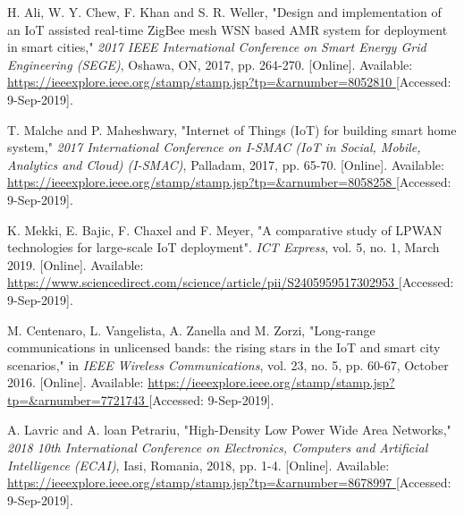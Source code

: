

\begin{thebibliography}{9}



H. Ali, W. Y. Chew, F. Khan and S. R. Weller, "Design and implementation of an IoT assisted real-time ZigBee mesh WSN based AMR system for deployment in smart cities," \textit{2017 IEEE International Conference on Smart Energy Grid Engineering (SEGE)}, Oshawa, ON, 2017, pp. 264-270.
[Online]. Available:
\url{
https://ieeexplore.ieee.org/stamp/stamp.jsp?tp=&arnumber=8052810
}
[Accessed: 9-Sep-2019].


T. Malche and P. Maheshwary, "Internet of Things (IoT) for building smart home system," \textit{2017 International Conference on I-SMAC (IoT in Social, Mobile, Analytics and Cloud) (I-SMAC)}, Palladam, 2017, pp. 65-70.
[Online]. Available:
\url{
https://ieeexplore.ieee.org/stamp/stamp.jsp?tp=&arnumber=8058258
}
[Accessed: 9-Sep-2019].


K. Mekki, E. Bajic, F. Chaxel and F. Meyer, "A comparative study of LPWAN technologies for large-scale IoT deployment". \textit{ICT Express}, vol. 5, no. 1, March 2019.
[Online]. Available:
\url{
https://www.sciencedirect.com/science/article/pii/S2405959517302953
}
[Accessed: 9-Sep-2019].

M. Centenaro, L. Vangelista, A. Zanella and M. Zorzi, "Long-range communications in unlicensed bands: the rising stars in the IoT and smart city scenarios," in \textit{IEEE Wireless Communications}, vol. 23, no. 5, pp. 60-67, October 2016.
[Online]. Available:
\url{
https://ieeexplore.ieee.org/stamp/stamp.jsp?tp=&arnumber=7721743
}
[Accessed: 9-Sep-2019].

A. Lavric and A. loan Petrariu, "High-Density Low Power Wide Area Networks," \textit{2018 10th International Conference on Electronics, Computers and Artificial Intelligence (ECAI)}, Iasi, Romania, 2018, pp. 1-4.
[Online]. Available:
\url{
https://ieeexplore.ieee.org/stamp/stamp.jsp?tp=&arnumber=8678997
}
[Accessed: 9-Sep-2019].


\end{thebibliography}
